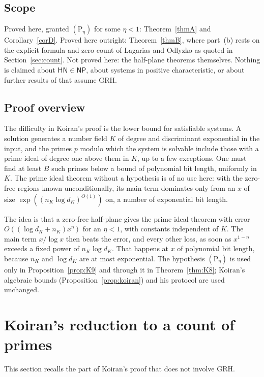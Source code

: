 \documentclass[11pt]{amsart}
\theoremstyle{definition}
\theoremstyle{remark}
\newcommand{\cl}[1]{\mathsf{#1}}
\newcommand{\HN}{\cl{HN}}
\newcommand{\Ph}[1]{(\mathrm P_{#1})}
\begin{document}
\subsection{Scope}
Proved here, granted $\Ph\eta$ for some $\eta<1$: Theorem~\ref{thmA} and Corollary~\ref{corD}. Proved here outright: Theorem~\ref{thmB}, where part~(b) rests on the explicit formula and zero count of Lagarias and Odlyzko as quoted in Section~\ref{sec:count}. Not proved here: the half-plane theorems themselves. Nothing is claimed about $\HN\in\cl{NP}$, about systems in positive characteristic, or about further results of \cite{M17} that assume GRH.

\subsection{Proof overview}\label{sec:overview}
The difficulty in Koiran's proof is the lower bound for satisfiable systems. A solution generates a number field $K$ of degree and discriminant exponential in the input, and the primes $p$ modulo which the system is solvable include those with a prime ideal of degree one above them in $K$, up to a few exceptions. One must find at least $B$ such primes below a bound of polynomial bit length, uniformly in $K$. The prime ideal theorem without a hypothesis is of no use here: with the zero-free regions known unconditionally, its main term dominates only from an $x$ of size $\exp((n_K\log d_K)^{O(1)})$ on, a number of exponential bit length.

The idea is that a zero-free half-plane gives the prime ideal theorem with error $O((\log d_K+n_K)x^{\eta})$ for an $\eta<1$, with constants independent of $K$. The main term $x/\log x$ then beats the error, and every other loss, as soon as $x^{1-\eta}$ exceeds a fixed power of $n_K\log d_K$. That happens at $x$ of polynomial bit length, because $n_K$ and $\log d_K$ are at most exponential. The hypothesis $\Ph\eta$ is used only in Proposition~\ref{prop:K9} and through it in Theorem~\ref{thm:K8}; Koiran's algebraic bounds (Proposition~\ref{prop:koiran}) and his protocol are used unchanged.

\section{Koiran's reduction to a count of primes}\label{sec:koiran}
This section recalls the part of Koiran's proof that does not involve GRH.
\end{document}
